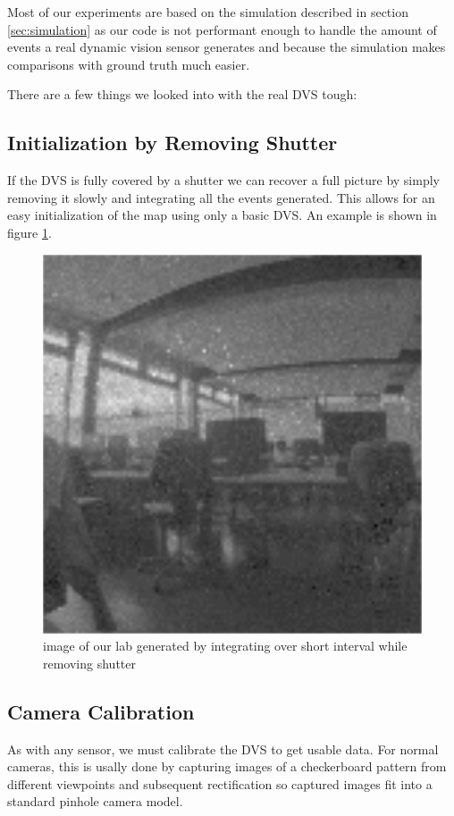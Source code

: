 Most of our experiments are based on the simulation described in section
\ref{sec:simulation} as our code is not performant enough to handle the amount
of events a real dynamic vision sensor generates and because the simulation
makes comparisons with ground truth much easier.

There are a few things we looked into with the real DVS tough:

\subsection{Initialization by Removing Shutter}
\label{sec:shutter_removal}
If the DVS is fully covered by a shutter we can recover a full picture by
simply removing it slowly and integrating all the events generated. This allows
for an easy initialization of the map using only a basic DVS. An example is shown in figure \ref{fig:shutter_integration}.

\begin{figure}
\includegraphics[width=\linewidth]{images/PCLab_integrated.png}
\caption{image of our lab generated by integrating over short interval while removing shutter}
\label{fig:shutter_integration}
\end{figure}


\subsection{Camera Calibration}
\label{sec:camera_calibration}
As with any sensor, we must calibrate the DVS to get usable data. For normal
cameras, this is usally done by capturing images of a checkerboard pattern from
different viewpoints and subsequent rectification so captured images fit into a
standard pinhole camera model.

